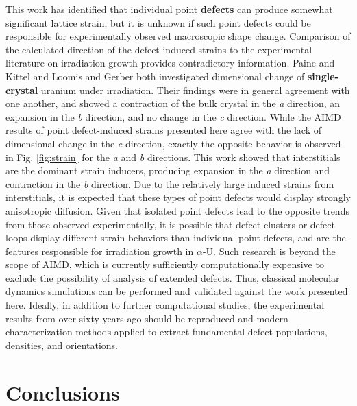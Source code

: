 \documentclass[utf8]{frontiersSCNS} %
\providecommand{\DIFaddtex}[1]{{\bf #1}} %
\providecommand{\DIFdeltex}[1]{} %
\providecommand{\DIFaddbegin}{\protect\color{blue}} %
\providecommand{\DIFaddend}{\protect\color{black}} %
\providecommand{\DIFdelbegin}{\protect\color{red}} %
\providecommand{\DIFdelend}{\protect\color{black}} %
\providecommand{\DIFadd}[1]{\texorpdfstring{\DIFaddtex{#1}}{#1}} %
\providecommand{\DIFdel}[1]{\texorpdfstring{\DIFdeltex{#1}}{}} %
\begin{document}
\DIFaddend This work has identified that individual point \DIFdelbegin \DIFdel{defect }\DIFdelend \DIFaddbegin \DIFadd{defects }\DIFaddend can produce somewhat significant lattice strain, but it is unknown if such point defects could be responsible for experimentally observed macroscopic shape change. Comparison of the calculated direction of the defect-induced strains to the experimental literature on irradiation growth provides contradictory information. Paine and Kittel \cite{paine1958} and Loomis and Gerber \cite{loomis1968} both investigated dimensional change of \DIFdelbegin \DIFdel{single crystal }\DIFdelend \DIFaddbegin \DIFadd{single-crystal }\DIFaddend uranium under irradiation. Their findings were in general agreement with one another, and showed a contraction of the bulk crystal in the \textit{a} direction, an expansion in the \textit{b} direction, and no change in the \textit{c} direction. While the AIMD results of point defect-induced strains presented here agree with the lack of dimensional change in the \textit{c} direction, exactly the opposite behavior is observed in Fig. \ref{fig:strain} for the \textit{a} and \textit{b} directions. This work showed that interstitials are the dominant strain inducers, producing expansion in the \textit{a} direction and contraction in the \textit{b} direction. Due to the relatively large induced strains from interstitials, it is expected that these types of point defects would display strongly anisotropic diffusion. Given that isolated point defects lead to the opposite trends from those observed experimentally, it is possible that defect clusters or defect loops display different strain behaviors than individual point defects, and are the features responsible for irradiation growth in $\alpha$-U. Such research is beyond the scope of AIMD, which is currently sufficiently computationally expensive to exclude the possibility of analysis of extended defects. Thus, classical molecular dynamics simulations can be performed \DIFdelbegin \DIFdel{, }\DIFdelend and validated against the work presented here. Ideally, in addition to further computational studies, the experimental results from over sixty years ago should be reproduced and modern characterization methods applied to extract fundamental defect populations, densities, and orientations. 

\DIFaddbegin \FloatBarrier

\DIFaddend \section{Conclusions}
\end{document}
